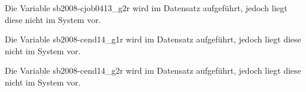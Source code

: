 \documentclass[a4paper]{article}
\begin{document}
				

				

				

				

				

				

				

				

				

				

		Die Variable sb2008-cjob0413\_g2r wird im Datensatz aufgeführt, jedoch liegt diese nicht im System vor.

				

				

				

				

				

				

				

		Die Variable sb2008-cend14\_g1r wird im Datensatz aufgeführt, jedoch liegt diese nicht im System vor.

		Die Variable sb2008-cend14\_g2r wird im Datensatz aufgeführt, jedoch liegt diese nicht im System vor.

				

				

				

				

				

				

				

				

				

				

				
\end{document}
